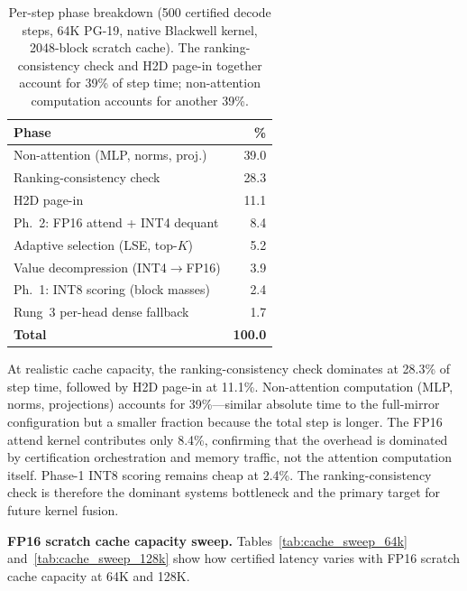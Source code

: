 \documentclass[10pt,twocolumn,a4paper]{article}
\theoremstyle{definition}
\theoremstyle{remark}
\begin{document}
\begin{table}[ht]
\centering
\caption{Per-step phase breakdown (500 certified decode steps, 64K PG-19, native Blackwell kernel, 2048-block scratch cache).  The ranking-consistency check and H2D page-in together account for 39\% of step time; non-attention computation accounts for another 39\%.}
\label{tab:phase_breakdown}
\footnotesize
\begin{tabular}{lr}
\toprule
\textbf{Phase} & \textbf{\%} \\
\midrule
Non-attention (MLP, norms, proj.) & 39.0 \\
Ranking-consistency check & 28.3 \\
H2D page-in & 11.1 \\
Ph.~2: FP16 attend + INT4 dequant & 8.4 \\
Adaptive selection (LSE, top-$K$) & 5.2 \\
Value decompression (INT4$\to$FP16) & 3.9 \\
Ph.~1: INT8 scoring (block masses) & 2.4 \\
Rung~3 per-head dense fallback & 1.7 \\
\midrule
\textbf{Total} & \textbf{100.0} \\
\bottomrule
\end{tabular}
\end{table}

At realistic cache capacity, the ranking-consistency check dominates at 28.3\% of step time, followed by H2D page-in at 11.1\%.  Non-attention computation (MLP, norms, projections) accounts for 39\%---similar absolute time to the full-mirror configuration but a smaller fraction because the total step is longer.  The FP16 attend kernel contributes only 8.4\%, confirming that the overhead is dominated by certification orchestration and memory traffic, not the attention computation itself.  Phase-1 INT8 scoring remains cheap at 2.4\%.  The ranking-consistency check is therefore the dominant systems bottleneck and the primary target for future kernel fusion.

\textbf{FP16 scratch cache capacity sweep.}  Tables~\ref{tab:cache_sweep_64k} and~\ref{tab:cache_sweep_128k} show how certified latency varies with FP16 scratch cache capacity at 64K and 128K.
\end{document}
